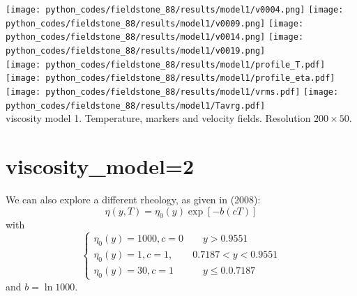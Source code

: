 \begin{center}
\texttt{[image: python\_codes/fieldstone\_88/results/model1/v0004.png]}
\texttt{[image: python\_codes/fieldstone\_88/results/model1/v0009.png]}
\texttt{[image: python\_codes/fieldstone\_88/results/model1/v0014.png]}
\texttt{[image: python\_codes/fieldstone\_88/results/model1/v0019.png]}\\
\texttt{[image: python\_codes/fieldstone\_88/results/model1/profile\_T.pdf]}
\texttt{[image: python\_codes/fieldstone\_88/results/model1/profile\_eta.pdf]} \\
\texttt{[image: python\_codes/fieldstone\_88/results/model1/vrms.pdf]}
\texttt{[image: python\_codes/fieldstone\_88/results/model1/Tavrg.pdf]}\\
{\captionfont viscosity model 1. Temperature, markers and velocity fields. Resolution $200\times 50$.}
\end{center}


\newpage
\section*{viscosity\_model=2}

We can also explore a different rheology, as given in \textcite{brhv08} (2008):
\[
\eta(y,T) = \eta_0(y) \exp [-b(cT)]
\]
with 
\[
\left\{
\begin{array}{c}
\eta_0(y)=1000, c=0 \qquad y> 0.9551 \\
\eta_0(y)=1,    c=1, \qquad  0.7187  <y< 0.9551 \\
\eta_0(y)=30,   c=1  \qquad\quad y \le 0.0.7187
\end{array}
\right.
\]
and $b=\ln 1000$.

